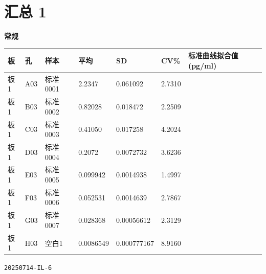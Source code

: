 \documentclass[UTF8,10pt,a4paper,fontset=fandol]{ctexart}
\begin{document}
\section*{汇总 1}
\textbf{常规}

\begin{center}
\small
\begin{tabular}{lllllll}
板 & 孔 & 样本 & 平均 & SD & CV\% & 标准曲线拟合值(pg/ml)\\ \hline
板1 & A03 & 标准0001 & 2.2347 & 0.061092 & 2.7310 & \\
板1 & B03 & 标准0002 & 0.82028 & 0.018472 & 2.2509 & \\
板1 & C03 & 标准0003 & 0.41050 & 0.017258 & 4.2024 & \\
板1 & D03 & 标准0004 & 0.2072 & 0.0072732 & 3.6236 & \\
板1 & E03 & 标准0005 & 0.099942 & 0.0014938 & 1.4997 & \\
板1 & F03 & 标准0006 & 0.052531 & 0.0014639 & 2.7867 & \\
板1 & G03 & 标准0007 & 0.028368 & 0.00056612 & 2.3129 & \\
板1 & H03 & 空白1 & 0.0086549 & 0.000777167 & 8.9160 &
\end{tabular}
\end{center}


\newpage

\noindent\texttt{20250714-IL-6}

\end{document}
